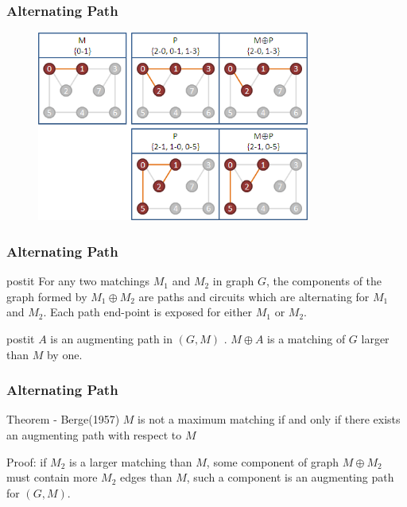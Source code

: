 \documentclass[hyperref={pdfpagelabels=false}]{beamer}
\begin{document}
\frame
{
	\frametitle{Alternating Path}
	
	\begin{figure}[htb]
	\centering
	\includegraphics[width=0.8\textwidth]{figures/symmetric_diff.png}
	\end{figure}
}

\frame
{
	\frametitle{Alternating Path}
	
	\begin{beamercolorbox}[sep=1em,wd=11cm]{postit}
		For any two matchings $M_{1}$ and $M_{2}$ in graph $G$, the components of the graph formed by $M_{1} \oplus M_{2}$ are paths and circuits which are alternating for $M_{1}$ and $M_{2}$. Each path end-point is exposed for either $M_{1}$ or $M_{2}$.
	\end{beamercolorbox}
	\bigskip
	\begin{beamercolorbox}[sep=1em,wd=11cm]{postit}
		$A$ is an augmenting path in $(G, M)$ . $M \oplus A$ is a matching of $G$ larger than $M$ by one.
	\end{beamercolorbox}
}

\frame
{
	\frametitle{Alternating Path}
	
	\begin{block}{Theorem - Berge(1957)}
		$M$ is not a maximum matching if and only if there exists an augmenting path with respect to $M$
	\end{block}	
	
	\begin{itemize}
	{
		\item Proof:
		if $M_{2}$ is a larger matching than $M$, some component of graph $M \oplus M_{2}$ must contain more $M_{2}$ edges than $M$, such a component is an augmenting path for $(G, M)$.
	}
	\end{itemize}
}
\end{document}
